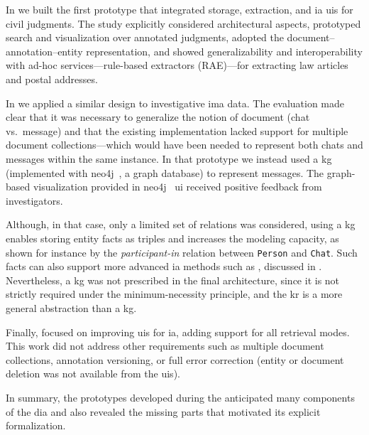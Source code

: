 


In \textcite{BELLANDI2024} we built the first prototype that integrated storage, extraction, and \acl{ia} \acsp{ui} for civil judgments. The study explicitly considered architectural aspects, prototyped search and visualization over annotated judgments, adopted the document--annotation--entity representation, and showed generalizability and interoperability with ad-hoc services---\ie rule-based extractors (RAE)---for extracting law articles and postal addresses.

In \textcite{pozzi_wise_2025} we applied a similar design to investigative \ac{ima} data. The evaluation made clear that it was necessary to generalize the notion of document (chat vs.\ message) and that the existing implementation lacked support for multiple document collections---which would have been needed to represent both chats and messages within the same instance. In that prototype we instead used a \acl{kg} (implemented with neo4j~\cite{neo4j}, a graph database) to represent messages. The graph-based visualization provided in neo4j~\cite{neo4j} \ac{ui} received positive feedback from investigators.

Although, in that case, only a limited set of relations was considered, using a \acf{kg} enables storing entity facts as triples and increases the modeling capacity, as shown for instance by the \textit{participant-in} relation between \texttt{Person} and \texttt{Chat}. Such facts can also support more advanced \acl{ia} methods such as , discussed in . Nevertheless, a \ac{kg} was not prescribed in the final architecture, since it is not strictly required under the minimum-necessity principle, and the \acf{kr} is a more general abstraction than a \ac{kg}.

Finally, \textcite{Agazzi2025DAVE} focused on improving \aclp{ui} for \acl{ia}, adding support for all retrieval modes. This work did not address other requirements such as multiple document collections, annotation versioning, or full error correction (\eg entity or document deletion was not available from the \acp{ui}).

In summary, the prototypes developed during the \phd anticipated many components of the \acl{dia} and also revealed the missing parts that motivated its explicit formalization.










